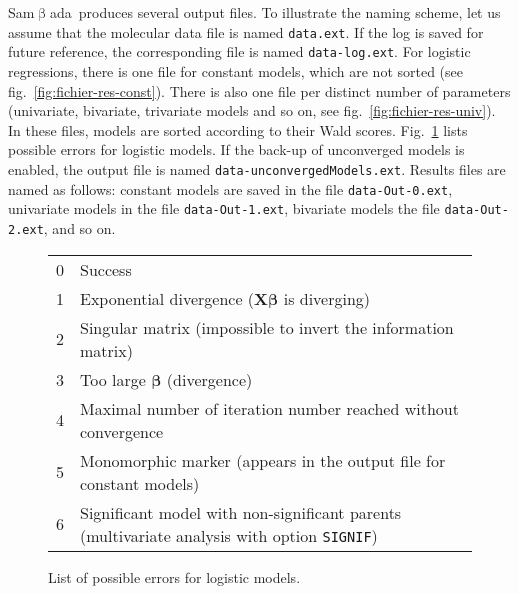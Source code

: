 \documentclass[a4paper,11pt]{article}
\newcommand{\smb}{\textsf{Sam$\upbeta$ada}}
\newcommand{\prog}[1]{\texttt{#1}}
\begin{document}
\smb\ produces several output files.
To illustrate the naming scheme, let us assume that the molecular data file is named \prog{data.ext}.
If the log is saved for future reference, the corresponding file is named \prog{data-log.ext}.
For logistic regressions, there is one file for constant models, which are not sorted (see fig.~\ref{fig:fichier-res-const}).
There is also one file per distinct number of parameters (univariate, bivariate, trivariate models and so on, see fig.~\ref{fig:fichier-res-univ}).
In these files, models are sorted according to their Wald scores.
Fig.~\ref{fig:errors} lists possible errors for logistic models.
If the back-up of unconverged models is enabled, the output file is named \prog{data-unconvergedModels.ext}.
Results files are named as follows: constant models are saved in the file \prog{data-Out-0.ext}, univariate models in the file \prog{data-Out-1.ext}, bivariate models the file \prog{data-Out-2.ext}, and so on.
%
\begin{figure}[htbp]
\begin{tabular}{ll}
0 & Success \\
1 & Exponential divergence ($\bm{X \beta}$ is diverging)\\
2 & Singular matrix (impossible to invert the information matrix) \\
3 & Too large $\bm{\beta}$ (divergence)\\
4 & Maximal number of iteration number reached without convergence\\
5 & Monomorphic marker (appears in the output file for constant models)\\
6 & Significant model with non-significant parents (multivariate analysis with option \texttt{SIGNIF})\\
\end{tabular}
\caption{List of possible errors for logistic models.}
\label{fig:errors}
\end{figure}
\end{document}
